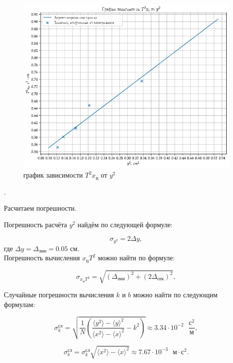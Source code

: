 \documentclass[a4paper, 12pt]{article}
\newcounter{Points}
\newcommand{\point}{\noindent \arabic{Points}. \addtocounter{Points}{1}}
\begin{document}
\begin{figure}
    \centering
    \includegraphics[width=15cm]{plot.png}
	\caption{график зависимости $ T^2x_ц$ от $y^2$}
    \label{pic:graph}
\end{figure}

\point Расчитаем погрешности.

Погрешность расчёта $ y^2 $ найдём по следующей формуле:

\begin{equation}
\sigma_{y^2}=2\Delta y,
\end{equation}
где $ \Delta y = \Delta_{лин} = 0.05$ см.\\

Погрешность вычисления $ x_цT^2 $ можно найти по формуле:

\begin{equation}
\sigma_{x_цT^2} = \sqrt{(\Delta_{лин})^2 + (2\Delta_{сек})^2},
\end{equation}

Случайные погрешности вычисления $ k $ и $ b $ можно найти по следующим формулам:

\begin{equation}
\sigma_k^\text{сл}=\sqrt{\frac{1}{N}\left(\frac{\langle y^2 \rangle - \langle y \rangle^2}{\langle x^2 \rangle - \langle x \rangle^2} - k^2 \right) } \approx 3.34 \cdot 10^{-2} \text{ }\frac{\text{с}^2}{\text{м}},
\end{equation}

\begin{equation}
\sigma_b^\text{сл}= \sigma_k^\text{сл} \sqrt{\langle x^2 \rangle - \langle x \rangle^2} \approx 7.67 \cdot 10^{-3} \text{ }\text{м}\cdot\text{с}^2.
\end{equation}
\end{document}
